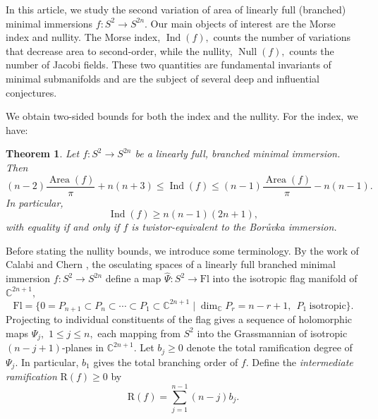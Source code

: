 \documentclass[11pt]{article}
\newtheorem{theorem}{Theorem}[section]
\theoremstyle{definition}
\newcommand{\C}{\mathbb{C}}
\numberwithin{equation}{section}
\begin{document}
In this article, we study the second variation of area of linearly full (branched) minimal immersions $f: S^2 \to S^{2n}$. Our main objects of interest are the Morse index and nullity. The Morse index, $\operatorname{Ind}(f),$ counts the number of variations that decrease area to second-order, while the nullity, $\operatorname{Null}(f),$ counts the number of Jacobi fields. These two quantities are fundamental invariants of minimal submanifolds and are the subject of several deep and influential conjectures.

We obtain two-sided bounds for both the index and the nullity. For the index, we have:
\begin{theorem}\label{thm:introS2IndexTheorem}
    Let $f: S^{2} \to S^{2n}$ be a linearly full, branched minimal immersion. Then
    \begin{equation*}
        (n-2) \frac{\operatorname{Area}(f)}{\pi} + n(n+3) \leq \operatorname{Ind}(f) \leq (n-1) \frac{\operatorname{Area}(f)}{\pi} - n(n-1).
    \end{equation*}
    In particular,
    \begin{equation*}
        \operatorname{Ind}(f) \geq n(n-1)(2n+1),
    \end{equation*}
    with equality if and only if $f$ is twistor-equivalent to the Bor\r{u}vka immersion.
\end{theorem}
Before stating the nullity bounds, we introduce some terminology. By the work of Calabi \cite{Calabi67} and Chern \cite{Chern70}, the osculating spaces of a linearly full branched minimal immersion $f : S^2 \to S^{2n}$ define a map $\widehat{\Psi} : S^2 \to \mathrm{Fl}$ into the isotropic flag manifold of $\C^{2n+1},$
\begin{equation*}
    \mathrm{Fl} = \lbrace 0 = P_{n+1} \subset P_n \subset \cdots \subset P_1 \subset \C^{2n+1} \mid \dim_\C P_r = n-r+1, \:\: P_1 \: \text{isotropic} \rbrace.
\end{equation*}
Projecting to individual constituents of the flag gives a sequence of holomorphic maps $\Psi_j,$ $1 \leq j \leq n,$ each mapping from $S^2$ into the Grassmannian of isotropic $(n-j+1)$-planes in $\C^{2n+1}.$ Let $b_j \geq 0$ denote the total ramification degree of $\Psi_j.$ In particular, $b_1$ gives the total branching order of $f.$ Define the \emph{intermediate ramification} $\mathrm{R}(f) \geq 0$ by
\begin{equation*}
    \mathrm{R}(f) = \sum_{j=1}^{n-1} (n-j)b_j.
\end{equation*}
\end{document}
